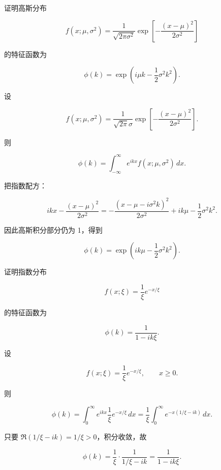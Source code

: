 ﻿





\begin{question}
证明高斯分布

\[
f(x;\mu,\sigma^2)=\frac{1}{\sqrt{2\pi\sigma^2}}\exp\left[-\frac{(x-\mu)^2}{2\sigma^2}\right]
\]

的特征函数为

\[
\phi(k)=\exp\left(i\mu k-\frac12\sigma^2k^2\right).
\]
\begin{solution}
设

\[
f(x;\mu,\sigma^2)=\frac{1}{\sqrt{2\pi}\sigma}\exp\!\left[-\frac{(x-\mu)^2}{2\sigma^2}\right].
\]

则

\[
\phi(k)=\int_{-\infty}^{\infty} e^{ikx} f(x;\mu,\sigma^2)\,dx.
\]

把指数配方：

\[
ikx-\frac{(x-\mu)^2}{2\sigma^2}
=
-\frac{(x-\mu-i\sigma^2 k)^2}{2\sigma^2}+ik\mu-\frac12\sigma^2k^2.
\]

因此高斯积分部分仍为 1，得到

\[
\phi(k)=\exp\!\left(ik\mu-\frac12\sigma^2k^2\right).
\]
\end{solution}
\end{question}



\begin{question}
证明指数分布

\[
f(x;\xi)=\frac1\xi e^{-x/\xi}
\]

的特征函数为

\[
\phi(k)=\frac{1}{1-ik\xi}.
\]
\begin{solution}
设

\[
f(x;\xi)=\frac1{\xi}e^{-x/\xi},\qquad x\ge 0.
\]

则

\[
\phi(k)=\int_0^\infty e^{ikx}\frac1{\xi}e^{-x/\xi}\,dx
=\frac1{\xi}\int_0^\infty e^{-x(1/\xi-ik)}\,dx.
\]

只要 \(\Re(1/\xi-ik)=1/\xi>0\)，积分收敛，故

\[
\phi(k)=\frac1{\xi}\cdot \frac1{1/\xi-ik}
=\frac1{1-ik\xi}.
\]
\end{solution}
\end{question}



